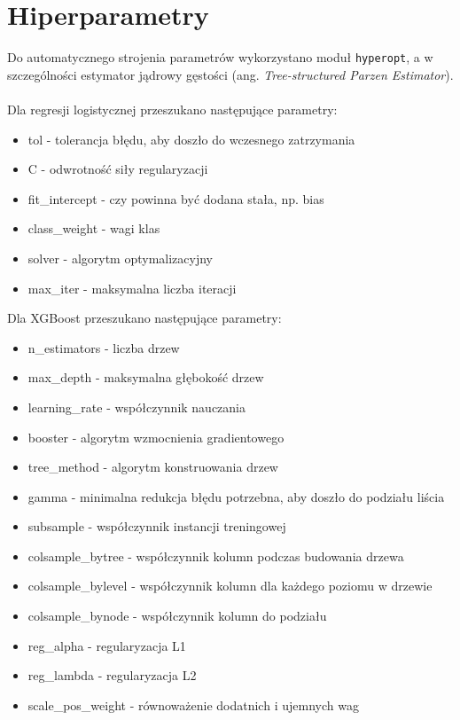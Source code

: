 \documentclass[12pt,a4paper]{article}
\begin{document}
\section*{Hiperparametry}
Do automatycznego strojenia parametrów wykorzystano moduł \texttt{hyperopt}, a w szczególności estymator jądrowy gęstości (ang. \textit{Tree-structured Parzen Estimator}).
\\
\\
Dla regresji logistycznej przeszukano następujące parametry:
\begin{itemize}
	\item tol - tolerancja błędu, aby doszło do wczesnego zatrzymania
	\item C - odwrotność siły regularyzacji
	\item fit\_intercept - czy powinna być dodana stała, np. bias
	\item class\_weight - wagi klas
	\item solver - algorytm optymalizacyjny
	\item max\_iter - maksymalna liczba iteracji
\end{itemize}
Dla XGBoost przeszukano następujące parametry:
\begin{itemize}
	\item n\_estimators - liczba drzew
	\item max\_depth - maksymalna głębokość drzew
	\item learning\_rate - współczynnik nauczania
	\item booster - algorytm wzmocnienia gradientowego
	\item tree\_method - algorytm konstruowania drzew
	\item gamma - minimalna redukcja błędu potrzebna, aby doszło do podziału liścia
	\item subsample - współczynnik instancji treningowej
	\item colsample\_bytree - współczynnik kolumn podczas budowania drzewa
	\item colsample\_bylevel - współczynnik kolumn dla każdego poziomu w drzewie
	\item colsample\_bynode - współczynnik kolumn do podziału
	\item reg\_alpha - regularyzacja L1
	\item reg\_lambda - regularyzacja L2
	\item scale\_pos\_weight - równoważenie dodatnich i ujemnych wag
\end{itemize}

\datatableA
\end{document}
